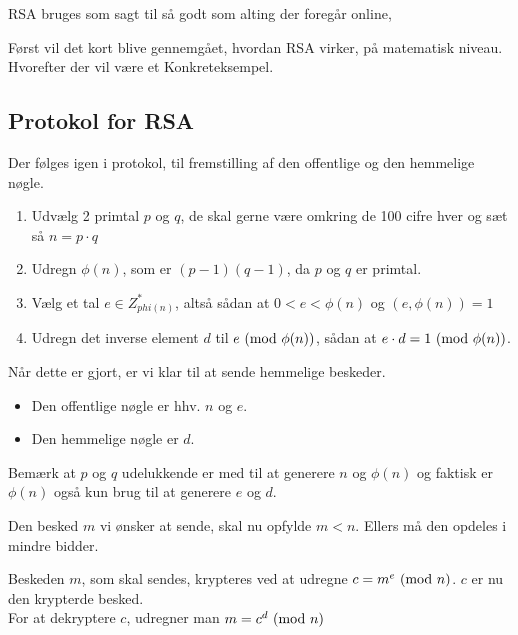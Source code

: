 RSA bruges som sagt til så godt som alting der foregår online,

Først vil det kort blive gennemgået, hvordan RSA virker, på matematisk niveau. Hvorefter der vil være et Konkreteksempel.
\subsection{Protokol for RSA}\label{rsaprot}
Der følges igen i protokol, til fremstilling af den offentlige og den hemmelige nøgle.
\begin{enumerate}
    \item Udvælg 2 primtal \(p\) og \(q\), de skal gerne være omkring de 100 cifre hver og sæt så \(n = p \cdot q\)
    \item Udregn \(\phi(n)\), som er \((p - 1) (q - 1)\), da \(p\) og \(q\) er primtal.
    \item Vælg et tal \(e \in Z_{phi(n)}^*\), altså sådan at \(0 < e < \phi(n)\) og \((e, \phi(n)) = 1\)
    \item Udregn det inverse element \(d\) til \(e \ (\mathrm{mod}\ \phi(n))\), sådan at \(e \cdot d = 1 \ (\mathrm{mod}\ \phi(n))\). \label{stepfour}
\end{enumerate}
Når dette er gjort, er vi klar til at sende hemmelige beskeder.
\begin{itemize}
    \item Den offentlige nøgle er hhv. \(n\) og \(e\).
    \item Den hemmelige nøgle er \(d\).
\end{itemize}

Bemærk at \(p\) og \(q\) udelukkende er med til at generere \(n\) og \(\phi(n)\) og faktisk er \(\phi(n)\) også kun brug til at generere \(e\) og \(d\).

Den besked \(m\) vi ønsker at sende, skal nu opfylde \(m < n\). Ellers må den opdeles i mindre bidder.

Beskeden \(m\), som skal sendes, krypteres ved at udregne \(c = m^e \ (\mathrm{mod}\ n)\). \(c\) er nu den krypterde besked.\\
For at dekryptere \(c\), udregner man \(m = c^d \ (\mathrm{mod}\ n)\)\\

